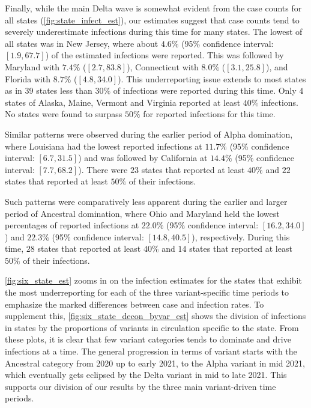 \documentclass{article}
\begin{document}
Finally, while the main Delta wave is somewhat evident from the case counts for all states 
(\autoref{fig:state_infect_est}), our estimates suggest that case counts tend to severely 
underestimate infections during this time for many states. The lowest of all states was in New Jersey,
where about $4.6\%$ (95\% confidence interval: $[1.9, 67.7]$) of the estimated infections were
 reported. This was followed by Maryland with $7.4\%$ ($[2.7, 83.8]$), Connecticut
with $8.0\%$ ($[3.1, 25.8]$), and Florida with $8.7\%$ ($[4.8, 34.0]$). This underreporting 
issue extends to most states as in $39$ states less than $30\%$ of infections were reported during
 this time. Only $4$ states of Alaska, Maine, Vermont and Virginia reported at least $40\%$ infections. 
 No states were found to surpass $50\%$ for reported infections for this time.

Similar patterns were observed during the earlier period of Alpha domination, 
where Louisiana had the lowest reported infections at 
$11.7\%$ (95\% confidence interval: $[6.7, 31.5]$) and was followed by California at 
$14.4\%$ (95\% confidence interval: $[7.7, 68.2]$). There were $23$ states that reported at least 
$40\%$ and $22$ states that reported at least $50\%$ of their infections.

Such patterns were comparatively less apparent during the earlier and larger period of Ancestral
 domination, where Ohio and Maryland held the lowest percentages of reported infections at 
 $22.0\%$ (95\% confidence interval: $[16.2, 34.0]$) and $22.3\%$ 
 (95\% confidence interval: $[14.8, 40.5]$), respectively. During this time, $28$ states
  that reported at least $40\%$ and $14$ states that reported at least $50\%$ of their infections. 

\autoref{fig:six_state_est} zooms in on the infection estimates for the states that exhibit the most
 underreporting for each of the three variant-specific time periods to emphasize the marked differences
  between case and infection rates. To supplement this, \autoref{fig:six_state_decon_byvar_est} 
  shows the division of infections in states by the proportions of variants in 
  circulation specific to the state. From these plots, it is clear that few variant categories tends
   to dominate and drive infections at a time. The general progression in terms of variant starts
    with the Ancestral category from 2020 up to early 2021, 
to the Alpha variant in mid 2021, which eventually gets eclipsed by the Delta variant in mid to late 2021. 
This supports our division of our results by the three main variant-driven time periods.
\end{document}
